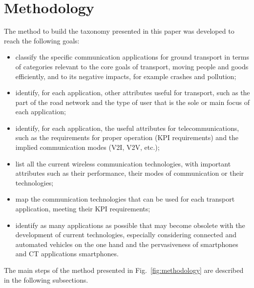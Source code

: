 \section{Methodology}

The method to build the taxonomy presented in this paper was developed to reach the following goals:

\begin{itemize}
\item classify the specific communication applications for ground transport in terms of categories relevant to the core goals of transport, moving people and goods efficiently, and to its negative impacts, for example crashes and pollution;
\item identify, for each application, other attributes useful for transport, such as the part of the road network and the type of user that is the sole or main focus of each application;
\item identify, for each application, the useful attributes for telecommunications, such as the requirements for proper operation (\acrshort{KPI} requirements) and the implied communication modes (\acrfull{V2I}, \acrfull{V2V}, etc.);
\item list all the current wireless communication technologies, %
  with important attributes such as their performance, their modes of communication or their technologies;%
\item map the communication technologies that can be used for each transport application, meeting their \acrshort{KPI} requirements;
\item identify as many applications as possible that may become obsolete with the development of current technologies, especially considering connected and automated vehicles on the one hand and the pervasiveness of smartphones and \acrshort{CT} applications smartphones.
\end{itemize}

The main steps of the method presented in Fig.~\ref{fig:methodology} are described in the following subsections. 

